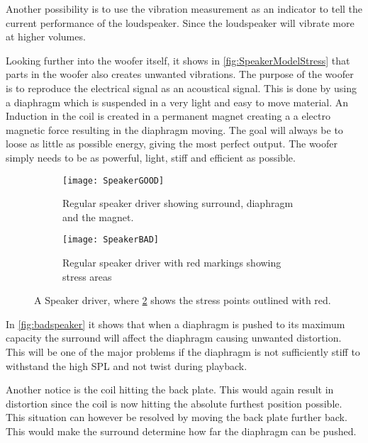 Another possibility is to use the vibration measurement as an indicator to tell the current performance of the loudspeaker. Since the loudspeaker will vibrate more at higher volumes. %


Looking further into the woofer itself, it shows in \autoref{fig:SpeakerModelStress} that parts in the woofer also creates unwanted vibrations. The purpose of the woofer is to reproduce the electrical signal as an acoustical signal. This is done by using a diaphragm which is suspended in a very light and easy to move material. An Induction in the coil is created in a permanent magnet creating a a electro magnetic force resulting in the diaphragm moving. The goal will always be to loose as little as possible energy, giving the most perfect output. The woofer simply needs to be as powerful, light, stiff and efficient as possible.

\begin{figure}[H]
\centering
\begin{subfigure}[t]{0.47\textwidth}
\texttt{[image: SpeakerGOOD]}
	\caption{Regular speaker driver showing surround, diaphragm and the magnet.}
	\label{fig:regularspeaker}
\end{subfigure}
\hspace{6mm} 
\begin{subfigure}[t]{0.47\textwidth}
\texttt{[image: SpeakerBAD]}
	\caption{Regular speaker driver with red markings showing stress areas}
	\label{fig:badspeaker}
\end{subfigure}
\caption{A Speaker driver, where \ref{fig:badspeaker} shows the stress points outlined with red.}
\label{fig:SpeakerModelStress}
\end{figure}
In \autoref{fig:badspeaker} it shows that when a diaphragm is pushed to its maximum capacity the surround will affect the diaphragm causing unwanted distortion. This will be one of the major problems if the diaphragm is not sufficiently stiff to withstand the high \gls{SPL} and not twist during playback. 

Another notice is the coil hitting the back plate. This would again result in distortion since the coil is now hitting the absolute furthest position possible. This situation can however be resolved by moving the back plate further back. This would make the surround determine how far the diaphragm can be pushed.

